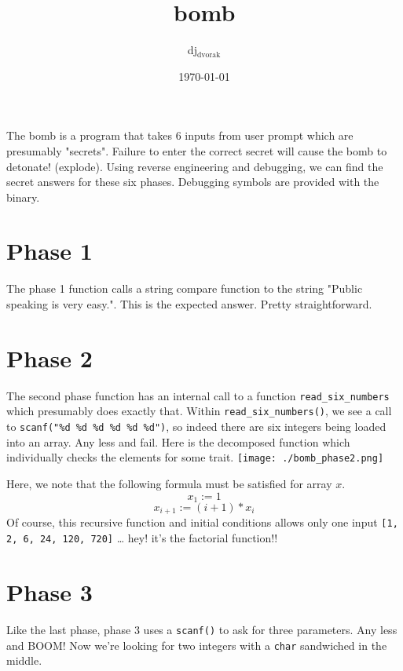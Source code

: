 \documentclass[11pt]{article}
\author{dj$_{\text{dvorak}}$}
\date{\today}
\title{bomb}
\begin{document}
\maketitle
\tableofcontents

The bomb is a program that takes 6 inputs from user prompt which are
presumably "secrets". Failure to enter the correct secret will cause the
bomb to detonate! (explode). Using reverse engineering and debugging, we can
find the secret answers for these six phases. Debugging symbols are provided
with the binary.
\section{Phase 1}
\label{sec-1}
The phase 1 function  calls a string compare function to the string "Public
speaking is very easy.". This is the expected answer. Pretty straightforward. 



\section{Phase 2}
\label{sec-2}
The second phase function has an internal call to a function
\texttt{read\_six\_numbers} which presumably does exactly that. Within 
\texttt{read\_six\_numbers()}, we see a call to \texttt{scanf("\%d \%d \%d \%d \%d \%d")}, so
indeed there are six integers being loaded into an array. Any less and fail. 
Here is the decomposed function which individually checks the elements for
some trait. 
\texttt{[image: ./bomb\_phase2.png]}

Here, we note that the following formula must be satisfied for array $x$.
$$ x_1 := 1 $$
$$ x_{i+1} := (i+1)* x_i $$ 
Of course, this recursive function and initial conditions allows only one
input \texttt{[1, 2, 6, 24, 120, 720]} \ldots{} hey! it's the factorial function!!



\section{Phase 3}
\label{sec-3}
Like the last phase, phase 3 uses a \texttt{scanf()} to ask for three parameters.
Any less and BOOM! Now we're looking for two integers with a \texttt{char}
sandwiched in the middle. 
\end{document}
